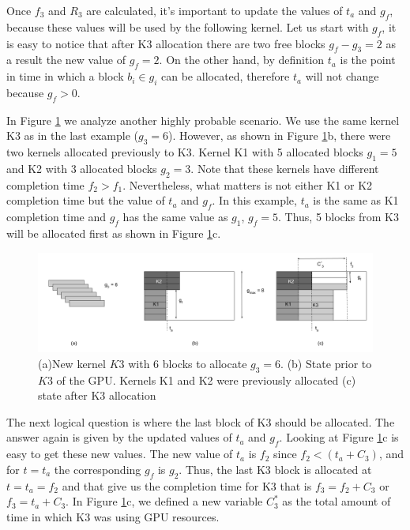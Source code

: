 \documentclass[
  12pt,
  a4paperpaper,
]{report}
\begin{document}
Once \(f_3\) and \(R_3\) are calculated, it's important to update the
values of \(t_a\) and \(g_f\), because these values will be used by the
following kernel. Let us start with \(g_f\), it is easy to notice that
after K3 allocation there are two free blocks \(g_f - g_3 = 2\) as a
result the new value of \(g_f = 2\). On the other hand, by definition
\(t_a\) is the point in time in which a block \(b_i \in g_i\) can be
allocated, therefore \(t_a\) will not change because \(g_f > 0\).

In Figure \ref{img:new_kernel_2} we analyze another highly probable
scenario. We use the same kernel K3 as in the last example
(\(g_3 = 6\)). However, as shown in Figure \ref{img:new_kernel_2}b,
there were two kernels allocated previously to K3. Kernel K1 with 5
allocated blocks \(g_1 = 5\) and K2 with 3 allocated blocks \(g_2 = 3\).
Note that these kernels have different completion time \(f_2 > f_1\).
Nevertheless, what matters is not either K1 or K2 completion time but
the value of \(t_a\) and \(g_f\). In this example, \(t_a\) is the same
as K1 completion time and \(g_f\) has the same value as \(g_1\),
\(g_f = 5\). Thus, 5 blocks from K3 will be allocated first as shown in
Figure \ref{img:new_kernel_2}c.~

\begin{figure}
\centering
\includegraphics{source/figures/new_kernel_2.png}
\caption{(a)New kernel \(K3\) with 6 blocks to allocate \(g_3 = 6\). (b)
State prior to \(K3\) of the GPU. Kernels K1 and K2 were previously
allocated (c) state after K3 allocation \label{img:new_kernel_2}}
\end{figure}

The next logical question is where the last block of K3 should be
allocated. The answer again is given by the updated values of \(t_a\)
and \(g_f\). Looking at Figure \ref{img:new_kernel_2}c is easy to get
these new values. The new value of \(t_a\) is \(f_2\) since
\(f_2 <( t_a + C_3 )\), and for \(t=t_a\) the corresponding \(g_f\) is
\(g_2\). Thus, the last K3 block is allocated at \(t=t_a=f_2\) and that
give us the completion time for K3 that is \(f_3 = f_2+C_3\) or
\(f_3 = t_a + C_3\). In Figure \ref{img:new_kernel_2}c, we defined a new
variable \(C^{*}_3\) as the total amount of time in which K3 was using
GPU resources.
\end{document}
